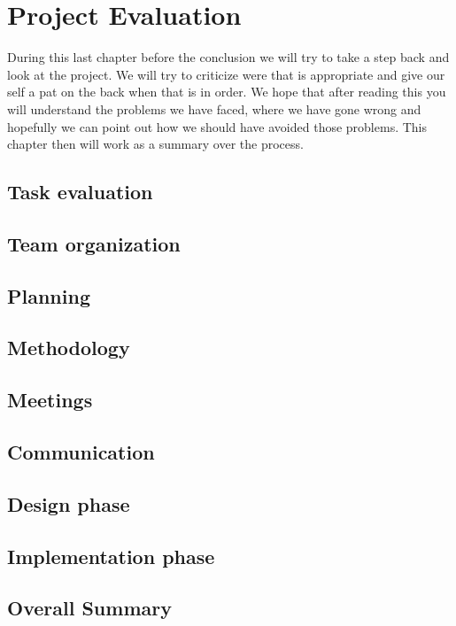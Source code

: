 \section{Project Evaluation}\label{Project Evaluation}
    During this last chapter before the conclusion we will try to take a step back and look at the project. We will try to criticize were that is appropriate and give our self a pat on the back when that is in order. We hope that after reading this you will understand the problems we have faced, where we have gone wrong and hopefully we can point out how we should have avoided those problems. This chapter then will work as a summary over the process.
    
    \subsection{Task evaluation}
        
    \subsection{Team organization}
        
    \subsection{Planning}
        
    \subsection{Methodology}
        
    \subsection{Meetings}
        
    \subsection{Communication}
        
    \subsection{Design phase}
        
    \subsection{Implementation phase}
        
    \subsection{Overall Summary}    
        




